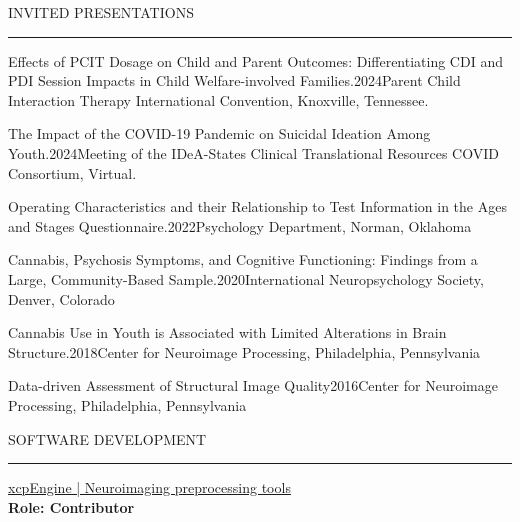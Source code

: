 \documentclass{resume} %
\renewenvironment{rSection}[1]{
	\sectionskip
	\textcolor{CarnegieMellonRed}{\MakeUppercase{#1}}
	\sectionlineskip
	\hrule
	\begin{list}{}{
			\setlength{\leftmargin}{1.5em}
		}
		\item[]
	}{
	\end{list}
}
\begin{document}
	\begin{rSection}{Invited Presentations}
		\begin{rSubsectionPres}{Effects of PCIT Dosage on Child and Parent Outcomes: Differentiating CDI and PDI Session Impacts in Child Welfare-involved Families.}{2024}{Parent Child Interaction Therapy International Convention, Knoxville, Tennessee.} 
		\end{rSubsectionPres}
		\begin{rSubsectionPres}{The Impact of the COVID-19 Pandemic on Suicidal Ideation Among Youth.}{2024}{Meeting of the IDeA-States Clinical Translational Resources COVID Consortium,  Virtual.} 
		\end{rSubsectionPres}
		\begin{rSubsectionPres}{Operating Characteristics and their Relationship to Test Information in the Ages and Stages Questionnaire.}{2022}{Psychology Department, Norman, Oklahoma} 
		\end{rSubsectionPres}
		\begin{rSubsectionPres}{Cannabis, Psychosis Symptoms, and Cognitive Functioning: Findings from a Large, Community-Based Sample.}{2020}{International Neuropsychology Society, Denver, Colorado} 
		\end{rSubsectionPres}
		\begin{rSubsectionPres}{Cannabis Use in Youth is Associated with Limited Alterations in Brain Structure.}{2018}{Center for Neuroimage Processing, Philadelphia, Pennsylvania} 
		\end{rSubsectionPres}
		\begin{rSubsectionPres}{Data-driven Assessment of Structural Image Quality}{2016}{Center for Neuroimage Processing, Philadelphia, Pennsylvania} 
		\end{rSubsectionPres}
	\end{rSection}
	
	\begin{rSection}{Software Development} \itemsep -2pt
		{\href{https://github.com/PennLINC/xcpEngine}{xcpEngine | Neuroimaging preprocessing tools}}\\
		{\bf{ \small{Role:}} Contributor}
	\end{rSection}
	
\end{document}
